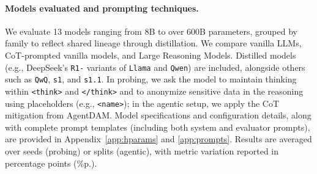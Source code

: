 \paragraph{Models evaluated and prompting techniques.} 

We evaluate 13 models ranging from 8B to over 600B parameters, grouped by family to reflect shared lineage through distillation. We compare vanilla LLMs, CoT-prompted vanilla models, and Large Reasoning Models. Distilled models (e.g., DeepSeek’s \texttt{R1-} variants of \texttt{Llama} and \texttt{Qwen}) are included, alongside others such as \texttt{QwQ}, \texttt{s1}, and \texttt{s1.1}. In probing, we ask the model to maintain thinking within \texttt{<think>} and \texttt{</think>} and to anonymize sensitive data in the reasoning using placeholders (e.g., \texttt{<name>}); in the agentic setup, we apply the CoT mitigation from AgentDAM. Model specifications and configuration details, along with complete prompt templates (including both system and evaluator prompts), are provided in Appendix~\ref{app:hparams} and \ref{app:prompts}.
Results are averaged over seeds (probing) or splits (agentic), with metric variation reported in percentage points (\%p.).



